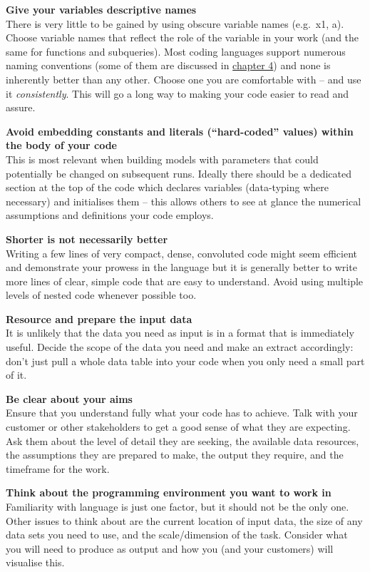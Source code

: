 \documentclass[
]{book}
\begin{document}
\textbf{Give your variables descriptive names}\\
There is very little to be gained by using obscure variable names (e.g.~x1, a). Choose variable names that reflect the role of the variable in your work (and the same for functions and subqueries). Most coding languages support numerous naming conventions (some of them are discussed in \protect\hyperlink{good}{chapter 4}) and none is inherently better than any other. Choose one you are comfortable with -- and use it \emph{consistently}. This will go a long way to making your code easier to read and assure.

\textbf{Avoid embedding constants and literals (``hard-coded'' values) within the body of your code}\\
This is most relevant when building models with parameters that could potentially be changed on subsequent runs. Ideally there should be a dedicated section at the top of the code which declares variables (data-typing where necessary) and initialises them -- this allows others to see at glance the numerical assumptions and definitions your code employs.

\textbf{Shorter is not necessarily better}\\
Writing a few lines of very compact, dense, convoluted code might seem efficient and demonstrate your prowess in the language but it is generally better to write more lines of clear, simple code that are easy to understand. Avoid using multiple levels of nested code whenever possible too.

\textbf{Resource and prepare the input data}\\
It is unlikely that the data you need as input is in a format that is immediately useful. Decide the scope of the data you need and make an extract accordingly: don't just pull a whole data table into your code when you only need a small part of it.

\textbf{Be clear about your aims}\\
Ensure that you understand fully what your code has to achieve. Talk with your customer or other stakeholders to get a good sense of what they are expecting. Ask them about the level of detail they are seeking, the available data resources, the assumptions they are prepared to make, the output they require, and the timeframe for the work.

\textbf{Think about the programming environment you want to work in}\\
Familiarity with language is just one factor, but it should not be the only one. Other issues to think about are the current location of input data, the size of any data sets you need to use, and the scale/dimension of the task. Consider what you will need to produce as output and how you (and your customers) will visualise this.
\end{document}
